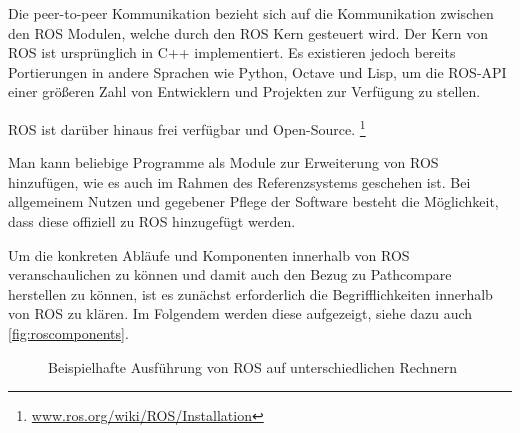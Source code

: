 Die peer-to-peer Kommunikation bezieht
sich auf die Kommunikation zwischen den ROS Modulen, welche
durch den ROS Kern gesteuert wird. Der Kern von ROS ist ursprünglich in C++
implementiert. Es existieren jedoch bereits Portierungen in andere Sprachen wie
Python, Octave und Lisp, um die ROS-\gls{API} einer größeren Zahl von
Entwicklern und Projekten zur Verfügung zu stellen. 


ROS ist darüber hinaus frei verfügbar und Open-Source. 
\footnote{\url{www.ros.org/wiki/ROS/Installation}}


Man kann beliebige Programme als Module zur Erweiterung von ROS hinzufügen, wie
es auch im Rahmen des Referenzsystems geschehen ist. Bei allgemeinem Nutzen und
gegebener Pflege der Software besteht die Möglichkeit, dass diese offiziell zu
ROS hinzugefügt werden.

Um die konkreten Abläufe und Komponenten innerhalb von ROS
veranschaulichen zu können und damit auch den Bezug zu Pathcompare herstellen
zu können, ist es zunächst erforderlich die Begrifflichkeiten innerhalb von
ROS zu klären. Im Folgendem werden diese aufgezeigt, siehe dazu auch
\autoref{fig:roscomponents}.

\begin{figure}[t]
  \begin{center}
  \end{center}
  \caption{Beispielhafte Ausführung von ROS auf unterschiedlichen Rechnern}
  \label{fig:roscomponents}
\end{figure}

